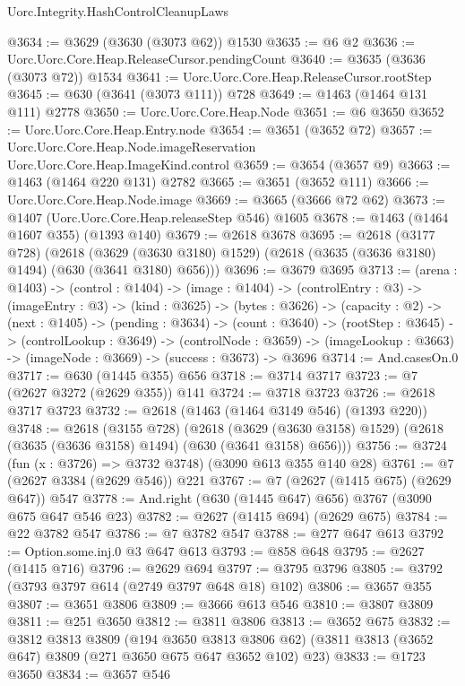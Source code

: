 \begin{lexlean}{Uorc.Integrity.HashControlCleanupLaws}
\begin{coremodule}
@3634 := @3629 (@3630 (@3073 @62)) @1530
@3635 := @6 @2
@3636 := Uorc.Uorc.Core.Heap.ReleaseCursor.pendingCount
@3640 := @3635 (@3636 (@3073 @72)) @1534
@3641 := Uorc.Uorc.Core.Heap.ReleaseCursor.rootStep
@3645 := @630 (@3641 (@3073 @111)) @728
@3649 := @1463 (@1464 @131 @111) @2778
@3650 := Uorc.Uorc.Core.Heap.Node
@3651 := @6 @3650
@3652 := Uorc.Uorc.Core.Heap.Entry.node
@3654 := @3651 (@3652 @72)
@3657 := Uorc.Uorc.Core.Heap.Node.imageReservation Uorc.Uorc.Core.Heap.ImageKind.control
@3659 := @3654 (@3657 @9)
@3663 := @1463 (@1464 @220 @131) @2782
@3665 := @3651 (@3652 @111)
@3666 := Uorc.Uorc.Core.Heap.Node.image
@3669 := @3665 (@3666 @72 @62)
@3673 := @1407 (Uorc.Uorc.Core.Heap.releaseStep @546) @1605
@3678 := @1463 (@1464 @1607 @355) (@1393 @140)
@3679 := @2618 @3678
@3695 := @2618
    (@3177 @728)
    (@2618
      (@3629 (@3630 @3180) @1529)
      (@2618 (@3635 (@3636 @3180) @1494) (@630 (@3641 @3180) @656)))
@3696 := @3679 @3695
@3713 := (arena : @1403) ->
  (control : @1404) ->
  (image : @1404) ->
  (controlEntry : @3) ->
  (imageEntry : @3) ->
  (kind : @3625) ->
  (bytes : @3626) ->
  (capacity : @2) ->
  (next : @1405) ->
  (pending : @3634) ->
  (count : @3640) ->
  (rootStep : @3645) ->
  (controlLookup : @3649) ->
  (controlNode : @3659) ->
  (imageLookup : @3663) -> (imageNode : @3669) -> (success : @3673) -> @3696
@3714 := And.casesOn.{0}
@3717 := @630 (@1445 @355) @656
@3718 := @3714 @3717
@3723 := @7 (@2627 @3272 (@2629 @355)) @141
@3724 := @3718 @3723
@3726 := @2618 @3717 @3723
@3732 := @2618 (@1463 (@1464 @3149 @546) (@1393 @220))
@3748 := @2618
    (@3155 @728)
    (@2618
      (@3629 (@3630 @3158) @1529)
      (@2618 (@3635 (@3636 @3158) @1494) (@630 (@3641 @3158) @656)))
@3756 := @3724 (fun (x : @3726) => @3732 @3748) (@3090 @613 @355 @140 @28)
@3761 := @7 (@2627 @3384 (@2629 @546)) @221
@3767 := @7 (@2627 (@1415 @675) (@2629 @647)) @547
@3778 := And.right (@630 (@1445 @647) @656) @3767 (@3090 @675 @647 @546 @23)
@3782 := @2627 (@1415 @694) (@2629 @675)
@3784 := @22 @3782 @547
@3786 := @7 @3782 @547
@3788 := @277 @647 @613
@3792 := Option.some.inj.{0} @3 @647 @613
@3793 := @858 @648
@3795 := @2627 (@1415 @716)
@3796 := @2629 @694
@3797 := @3795 @3796
@3805 := @3792 (@3793 @3797 @614 (@2749 @3797 @648 @18) @102)
@3806 := @3657 @355
@3807 := @3651 @3806
@3809 := @3666 @613 @546
@3810 := @3807 @3809
@3811 := @251 @3650
@3812 := @3811 @3806
@3813 := @3652 @675
@3832 := @3812
    @3813
    @3809
    (@194 @3650 @3813 @3806 @62)
    (@3811 @3813 (@3652 @647) @3809 (@271 @3650 @675 @647 @3652 @102) @23)
@3833 := @1723 @3650
@3834 := @3657 @546

\end{coremodule}
\end{lexlean}
